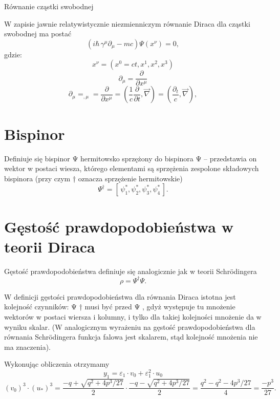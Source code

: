\documentclass{article}
\begin{document}
Równanie cząstki swobodnej

W zapisie jawnie relatywistycznie niezmienniczym równanie Diraca dla cząstki swobodnej ma postać
$${ (i\hbar \,\gamma ^{\mu }\partial _{\mu }-mc)\Psi (x^{\nu })=0,}$$
gdzie:
$${ x^{\nu }=(x^{0}=ct,x^{1},x^{2},x^{3})}$$
$${ \partial _{\mu }={\frac {\partial }{\partial x^{\mu }}}}$$
$${ \partial _{\mu }=_{,\mu }={\frac {\partial }{\partial x^{\mu }}}=\left({\frac {1}{c}}{\frac {\partial }{\partial t}},{\vec {\nabla }}\right)=\left({\frac {\partial _{t}}{c}},{\vec {\nabla }}\right),}$$

\section{Bispinor}
Definiuje się bispinor Ψ  hermitowsko sprzężony do bispinora Ψ  – przedstawia on wektor w postaci wiesza, którego elementami są sprzężenia zespolone składowych bispinora (przy czym † oznacza sprzężenie hermitowskie) 
$${ \Psi ^{\dagger }=[\,\psi _{1}^{*},\psi _{2}^{*},\psi _{3}^{*},\psi _{4}^{*}\,].}$$

\section{Gęstość prawdopodobieństwa w teorii Diraca}
Gęstość prawdopodobieństwa definiuje się analogicznie jak w teorii Schrödingera 
$${ \rho =\Psi ^{\dagger }\Psi .}$$

W definicji gęstości prawdopodobieństwa dla równania Diraca istotna jest kolejność czynników: Ψ † musi być przed Ψ , gdyż występuje tu mnożenie wektorów w postaci wiersza i kolumny, i tylko dla takiej kolejności mnożenie da w wyniku skalar. (W analogicznym wyrażeniu na gęstość prawdopodobieństwa dla równania Schrödingera funkcja falowa jest skalarem, stąd kolejność mnożenia nie ma znaczenia).

Wykonując obliczenia otrzymamy 
$$y_1=\varepsilon_1\cdot v_0+\varepsilon_1^2\cdot u_0$$
$$(v_0)^3\cdot (u_*)^3=\frac{-q+\sqrt{q^2+4p^3/27}}{2}\cdot \frac{-q-\sqrt{q^2+4p^3/27}}{2}=\frac{q^2-q^2-4p^3/27}{4}=\frac{-p^3}{27}.$$
\end{document}
